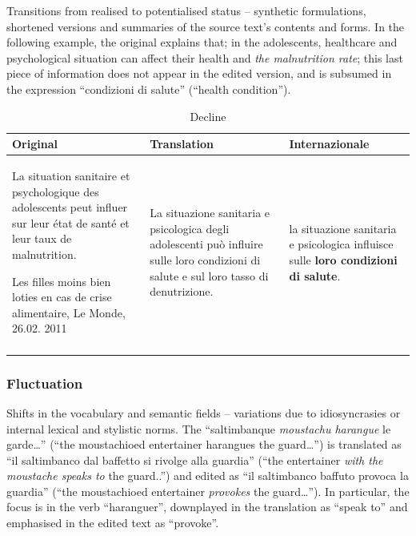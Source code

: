 \documentclass[output=paper]{LSP/langsci}
\begin{document}
Transitions from realised to potentialised status -- synthetic formulations, shortened versions and summaries of the source text's contents and forms. In the following example, the original explains that; in the adolescents, healthcare and psychological situation can affect their health and \textit{the malnutrition rate}; this last piece of information does not appear in the edited version, and is subsumed in the expression ``condizioni di salute'' (``health condition'').

%
\begin{table}
 \tiny
 \caption{Decline}
 \label{troqe-marchan:tab:5}
\begin{tabularx}{\textwidth}{XXX}
\lsptoprule
  Original &  Translation &  Internazionale\\
  \midrule
La situation sanitaire et psychologique des adolescents peut influer sur leur état de santé et leur taux de malnutrition.

 Les filles moins bien loties en cas de crise alimentaire, Le Monde, 26.02. 2011 &  La situazione sanitaria e psicologica degli adolescenti può influire sulle loro condizioni di salute e sul loro tasso di denutrizione.  &  la situazione sanitaria e psicologica influisce sulle \textbf{loro condizioni di salute}. \\
\lspbottomrule
\end{tabularx}
\end{table}

\subsubsection{Fluctuation}

Shifts in the vocabulary and semantic fields -- variations due to idiosyncrasies or internal lexical and stylistic norms. The  ``saltimbanque \textit{moustachu harangue} le garde\ldots ''  (``the  moustachioed entertainer harangues the guard\ldots '') is translated as ``il saltimbanco dal baffetto si rivolge alla guardia'' (``the entertainer \textit{with the moustache speaks to} the guard..'') and edited as ``il saltimbanco baffuto provoca la guardia'' (``the moustachioed entertainer \textit{provokes} the guard\ldots ''). In particular, the focus is in the  verb ``haranguer'', downplayed in the translation as ``speak to'' and emphasised in the edited text as ``provoke''. 
\end{document}
